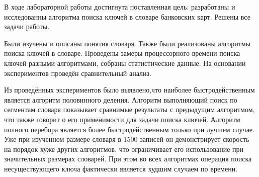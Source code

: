 В ходе лабораторной работы достигнута поставленная цель: разработаны и исследованны алгоритма поиска ключей в словаре банковских карт. Решены все задачи работы.

Были изучены и описаны понятия словаря. Также были реализованы алгоритмы поиска ключей в словаре. Проведены замеры процессорного времени поиска ключей разными алгоритмами, собраны статистические данные. На основании экспериментов проведён сравнительный анализ.

Из проведённых экспериментов было выявлено,что наиболее быстродейственным является алгоритм половинного деления. Алгоритм выполняющий поиск по сегментам словаря показывает сравнимые результаты с предыдущим алгоритмом, что также говорит о его применимости для задачи поиска ключей. Алгоритм полного перебора является более быстродейственным только при лучшем случае. Уже при изученном размере словаря в 1500 записей он демонстрирует скорость на порядок хуже других алгоритмов, что ограничивает его использование при значительных размерах словарей. При этом во всех алгоритмах операция поиска несуществующего ключа фактически является худшим случаем по времени.
